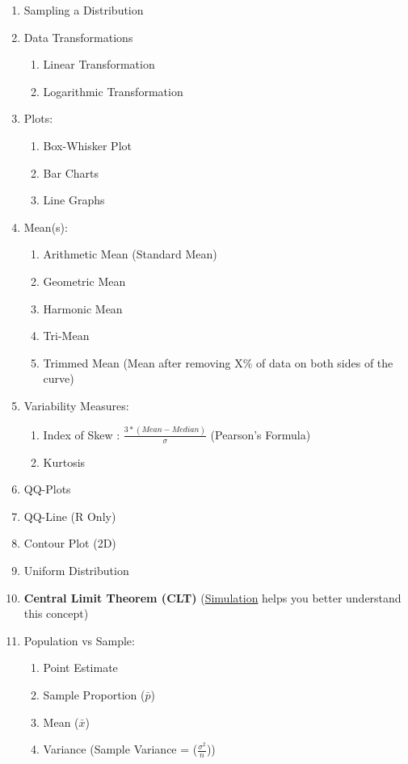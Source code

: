 \documentclass[11pt]{article}
\begin{document}
\begin{enumerate}
\begin{enumerate}
		\end{enumerate}
		\item Sampling a Distribution
		\item Data Transformations
		\begin{enumerate}
			\item Linear Transformation
			\item Logarithmic Transformation
		\end{enumerate}
		\item Plots:
		\begin{enumerate}
			\item Box-Whisker Plot
			\item Bar Charts
			\item Line Graphs
		\end{enumerate}
		\item Mean(s):
		\begin{enumerate}
			\item Arithmetic Mean (Standard Mean)
			\item Geometric Mean
			\item Harmonic Mean
			\item Tri-Mean
			\item Trimmed Mean (Mean after removing X\%  of data on both sides of the curve)
		\end{enumerate}
		\item Variability Measures:
		\begin{enumerate}
			\item Index of Skew :  $ \frac{3 * ( Mean - Median )}{ \sigma }$ (Pearson's Formula)
			\item Kurtosis
		\end{enumerate}
		\item QQ-Plots
		\item QQ-Line (R Only)
		\item Contour Plot (2D)
		\item Uniform Distribution
		\item \textbf{Central Limit Theorem (CLT)} (\href{http://onlinestatbook.com/2/sampling_distributions/clt_demo.html}{Simulation} helps you better understand this concept)
		\item Population vs Sample:
		\begin{enumerate}
			\item Point Estimate
			\item Sample Proportion ($\bar{p}$)
			\item Mean ($\bar{x}$)
			\item Variance (Sample Variance = ($ \frac{\sigma^2}{n} $))

\end{enumerate}
\end{enumerate}
\end{document}
